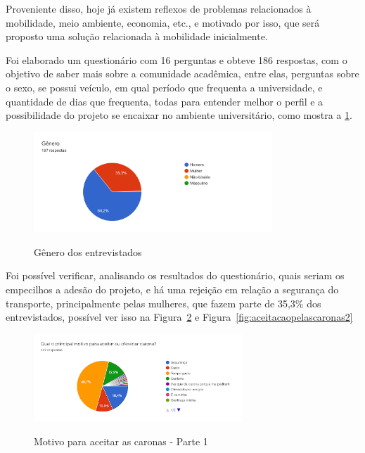 Proveniente disso, hoje já existem reflexos de problemas relacionados à mobilidade, meio ambiente, economia, etc., e motivado por isso, que será proposto uma solução relacionada à mobilidade inicialmente.



Foi elaborado um questionário com 16 perguntas e obteve 186 respostas, com o objetivo de saber mais sobre a comunidade acadêmica, entre elas, perguntas sobre o sexo, se possui veículo, em qual período que frequenta a universidade, e quantidade de dias que frequenta, todas para entender melhor o perfil e a possibilidade do projeto se encaixar no ambiente universitário, como mostra a \ref{fig:genero}.

\begin{figure}[!hbtp]
	\centering
	\caption{Gênero dos entrevistados}
	\includegraphics[width=0.8\textwidth]{./04-figuras/questionario/2.png}
	\label{fig:genero}
\end{figure}

Foi possível verificar, analisando os resultados do questionário, quais seriam os empecilhos a adesão do projeto, e há uma rejeição em relação a segurança do transporte, principalmente pelas mulheres, que fazem parte de 35,3\% dos entrevistados, possível ver isso na Figura~\ref{fig:aceitacaopelascaronas} e Figura~\ref{fig:aceitacaopelascaronas2}%

\begin{figure}[!hbtp]
	\centering
	\caption{Motivo para aceitar as caronas - Parte 1}
	\includegraphics[width=0.7\textwidth]{./04-figuras/questionario/3.png}
	\label{fig:aceitacaopelascaronas}
\end{figure}

